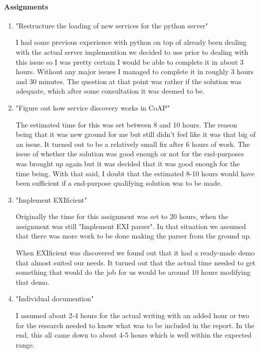 \paragraph{Assignments}
\begin{enumerate}
\item{"Restructure the loading of new services for the python server"}

I had some previous experience with python on top of already been dealing with the actual server implemention we decided to use prior to dealing with this issue so I was pretty certain I would be able to complete it in about 3 hours.
Without any major issues I managed to complete it in roughly 3 hours and 30 minutes. The question at that point was rather if the solution was adequate, which after some consultation it was deemed to be.

\item {"Figure out how service discovery works in CoAP"}

The estimated time for this was set between 8 and 10 hours. The reason being that it was new ground for me but still didn't feel like it was that big of
an issue. It turned out to be a relatively small fix after 6 hours of work. The issue of whether the solution was good enough or not for the end-purposes was brought up again but it was decided that it was good enough for the time being.
With that said, I doubt that the estimated 8-10 hours would have been sufficient if a end-purpose qualifying solution was to be made. 

\item {"Implement EXIficient"}

Originally the time for this assignment was set to 20 hours, when the assignment was still "Implement EXI parser". In that situation we assumed that there was more work to be done making the parser from the ground up.

When EXIficient was discovered we found out that it had a ready-made demo that almost suited our needs. It turned out that the actual time needed to get something that would do the job for us would be around 10 hours modifying that demo.

\item {"Individual documention"}

I assumed about 2-4 hours for the actual writing with an added hour or two for the research needed to know what was to be included in the report. In the end, this all came down to about 4-5 hours which is well within the expected range.

\end{enumerate}

